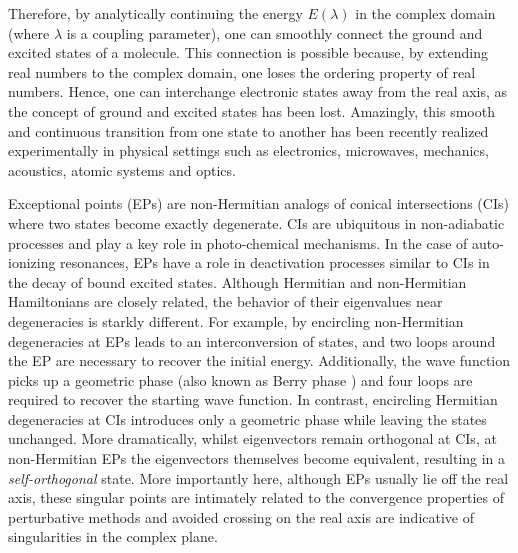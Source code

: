 \documentclass[11pt,a4paper]{article}
\begin{document}
Therefore, by analytically continuing the energy $E(\lambda)$ in the complex domain (where $\lambda$ is a coupling parameter), one can smoothly connect the ground and excited states of a molecule.
This connection is possible because, by extending real numbers to the complex domain, one loses the ordering property of real numbers.
Hence, one can interchange electronic states away from the real axis, as the concept of ground and excited states has been lost.
Amazingly, this smooth and continuous transition from one state to another has been recently realized experimentally in physical settings such as electronics, microwaves, mechanics, acoustics, atomic systems and optics. \cite{Bittner_2012, Chong_2011, Chtchelkatchev_2012, Doppler_2016, Guo_2009, Hang_2013, Liertzer_2012, Longhi_2010, Peng_2014, Peng_2014a, Regensburger_2012, Ruter_2010, Schindler_2011, Szameit_2011, Zhao_2010, Zheng_2013, Choi_2018, El-Ganainy_2018}


Exceptional points (EPs) \cite{Heiss_1990, Heiss_1999, Heiss_2012, Heiss_2016} are non-Hermitian analogs of conical intersections (CIs) \cite{Yarkony_1996} where two states become exactly degenerate.
CIs are ubiquitous in non-adiabatic processes and play a key role in photo-chemical mechanisms.
In the case of auto-ionizing resonances, EPs have a role in deactivation processes similar to CIs in the decay of bound excited states.
Although Hermitian and non-Hermitian Hamiltonians are closely related, the behavior of their eigenvalues near degeneracies is starkly different.
For example, by encircling non-Hermitian degeneracies at EPs leads to an interconversion of states, and two loops around the EP are necessary to recover the initial energy.
Additionally, the wave function picks up a geometric phase (also known as Berry phase \cite{Berry_1984}) and four loops are required to recover the starting wave function.
In contrast, encircling Hermitian degeneracies at CIs introduces only a geometric phase while leaving the states unchanged.
More dramatically, whilst eigenvectors remain orthogonal at CIs, at non-Hermitian EPs the eigenvectors themselves become equivalent, resulting in a \textit{self-orthogonal} state. \cite{MoiseyevBook}
More importantly here, although EPs usually lie off the real axis, these singular points are intimately related to the convergence properties of perturbative methods and avoided crossing on the real axis are indicative of singularities in the complex plane. \cite{Olsen_1996, Olsen_2000} 

\end{document}
